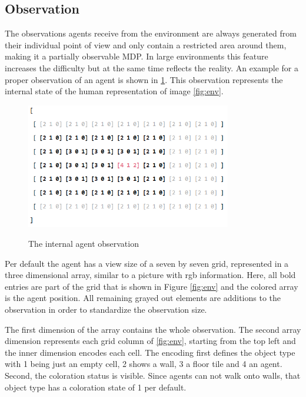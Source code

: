 \subsection{Observation}
The observations agents receive from the environment are always generated from their individual point of view and only contain a restricted area around them, making it a partially observable MDP. In large environments this feature increases the difficulty but at the same time reflects the reality. An example for a proper observation of an agent is shown in \ref{fig:agent_obs}. This observation represents the internal state of the human representation of image \ref{fig:env}.

\begin{figure}[hpbt]
    \centering
    \includegraphics[width=0.8\textwidth]{pictures/agent_observation}\\
    \caption[Agent Observation]{The internal agent observation}\label{fig:agent_obs}
\end{figure}

Per default the agent has a view size of a seven by seven grid, represented in a three dimensional array, similar to a picture with rgb information. Here, all bold entries are part of the grid that is shown in Figure \ref{fig:env} and the colored array is the agent position. All remaining grayed out elements are additions to the observation in order to standardize the observation size.

The first dimension of the array contains the whole observation. The second array dimension represents each grid column of \ref{fig:env}, starting from the top left and the inner dimension encodes each cell. The encoding first defines the object type with 1 being just an empty cell, 2 shows a wall, 3 a floor tile and 4 an agent. Second, the coloration status is visible. Since agents can not walk onto walls, that object type has a coloration state of 1 per default.

